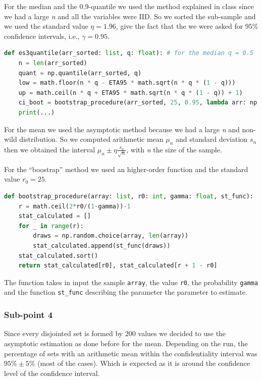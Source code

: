 \documentclass[10pt,a4paper]{article}
\begin{document}
For the median and the 0.9-quantile we used the method explained in class since we had a large \emph{n} and all the variables were IID. So we sorted the sub-sample and we used the standard value \(\eta = 1.96\), give the fact that the we were asked for \(95\%\) confidence intervals, i.e., \(\gamma = 0.95\).

\begin{lstlisting}[language=python]
def es3quantile(arr_sorted: list, q: float): # for the median q = 0.5
    n = len(arr_sorted)
    quant = np.quantile(arr_sorted, q)
    low = math.floor(n * q - ETA95 * math.sqrt(n * q * (1 - q)))
    up = math.ceil(n * q + ETA95 * math.sqrt(n * q * (1 - q)) + 1)
    ci_boot = bootstrap_procedure(arr_sorted, 25, 0.95, lambda arr: np.quantile(arr, q))
    print(...)
\end{lstlisting}

For the mean we used the asymptotic method because we had a large \emph{n} and non-wild distribution. So we computed arithmetic mean \(\mu_{n}\) and standard deviation \(s_{n}\) then we obtained the interval \(\mu_{n}\pm \eta\frac{s_{n}}{\sqrt{n}}\), with \emph{n} the size of the sample.

For the ``boostrap'' method we used an higher-order function and the standard value \(r_{0} = 25\).
\begin{lstlisting}[language=python]
def bootstrap_procedure(array: list, r0: int, gamma: float, st_func):
    r = math.ceil(2*r0/(1-gamma))-1
    stat_calculated = []
    for _ in range(r):
        draws = np.random.choice(array, len(array))
        stat_calculated.append(st_func(draws))
    stat_calculated.sort()
    return stat_calculated[r0], stat_calculated[r + 1 - r0]
\end{lstlisting}
The function takes in input the sample \texttt{array}, the value \texttt{r0}, the probability \texttt{gamma} and the function \texttt{st\_func} describing the parameter the parameter to estimate.

\subsubsection*{Sub-point 4}

Since every disjointed set is formed by \(200\) values we decided to use the asymptotic estimation as done before for the mean. Depending on the run, the percentage of sets with an arithmetic mean within the confidentiality interval was \(95\%\pm5\%\) (most of the cases). Which is expected as it is around the confidence level of the confidence interval.
\end{document}
